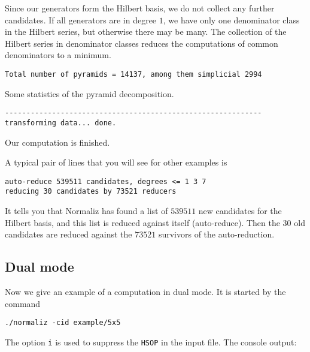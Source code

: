 \documentclass[12pt,a4paper]{scrartcl}
\theoremstyle{definition}
\begin{document}
Since our generators form the Hilbert basis, we do not collect any further candidates. If all generators are in degree $1$, we have only one denominator class in the Hilbert series, but otherwise there may be many. The collection of the Hilbert series in denominator classes reduces the computations of common denominators to a minimum.
\begin{Verbatim}
Total number of pyramids = 14137, among them simplicial 2994
\end{Verbatim}
Some statistics of the pyramid decomposition.
\begin{Verbatim}
------------------------------------------------------------
transforming data... done.
\end{Verbatim}
Our computation is finished.

A typical pair of lines that you will see for other examples is
\begin{Verbatim}
auto-reduce 539511 candidates, degrees <= 1 3 7 
reducing 30 candidates by 73521 reducers
\end{Verbatim}
It tells you that Normaliz has found a list of $539511$ new candidates for the Hilbert basis, and this list is reduced against itself (auto-reduce). Then the $30$ old candidates are reduced against the $73521$ survivors of the auto-reduction.

\subsection{Dual mode}

Now we give an example of a computation in dual mode. It is started by the command
\begin{Verbatim}
./normaliz -cid example/5x5
\end{Verbatim}
The option \verb|i| is used to suppress the \verb|HSOP| in the input file. The console output:
\end{document}
